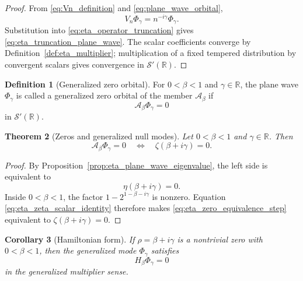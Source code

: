 \documentclass[11pt]{amsart}
\numberwithin{equation}{section}
\theoremstyle{plain}
\newtheorem{theorem}{Theorem}[section]
\newtheorem{corollary}[theorem]{Corollary}
\theoremstyle{definition}
\newtheorem{definition}[theorem]{Definition}
\theoremstyle{remark}
\newcommand{\R}{\mathbb{R}}
\newcommand{\Sch}{\mathcal{S}}
\begin{document}
\begin{proof}
From \eqref{eq:Vn_definition} and
\eqref{eq:plane_wave_orbital},
\begin{equation}
V_n\Phi_\gamma
=n^{-i\gamma}\Phi_\gamma.
\label{eq:Vn_plane_wave}
\end{equation}
Substitution into \eqref{eq:eta_operator_truncation} gives
\eqref{eq:eta_truncation_plane_wave}.  The scalar coefficients converge by
Definition~\ref{def:eta_multiplier}; multiplication of a fixed tempered
distribution by convergent scalars gives convergence in $\Sch'(\R)$.
\end{proof}

\begin{definition}[Generalized zero orbital]
\label{def:generalized_zero_orbital}
For $0<\beta<1$ and $\gamma\in\R$, the plane wave $\Phi_\gamma$ is called a
generalized zero orbital of the member $\mathcal A_\beta$ if
\begin{equation}
\mathcal A_\beta\Phi_\gamma=0
\label{eq:zero_orbital_definition}
\end{equation}
in $\Sch'(\R)$.
\end{definition}

\begin{theorem}[Zeros and generalized null modes]
\label{thm:zeros_as_generalized_null_modes}
Let $0<\beta<1$ and $\gamma\in\R$.  Then
\begin{equation}
\mathcal A_\beta\Phi_\gamma=0
\quad\Longleftrightarrow\quad
\zeta(\beta+i\gamma)=0.
\label{eq:zero_mode_equivalence}
\end{equation}
\end{theorem}

\begin{proof}
By Proposition~\ref{prop:eta_plane_wave_eigenvalue}, the left side is
equivalent to
\begin{equation}
\eta(\beta+i\gamma)=0.
\label{eq:eta_zero_equivalence_step}
\end{equation}
Inside $0<\beta<1$, the factor $1-2^{1-\beta-i\gamma}$ is nonzero.
Equation \eqref{eq:eta_zeta_scalar_identity} therefore makes
\eqref{eq:eta_zero_equivalence_step} equivalent to
$\zeta(\beta+i\gamma)=0$.
\end{proof}

\begin{corollary}[Hamiltonian form]
\label{cor:zero_orbital_hamiltonian}
If $\rho=\beta+i\gamma$ is a nontrivial zero with $0<\beta<1$, then the
generalized mode $\Phi_\gamma$ satisfies
\begin{equation}
H_\beta\Phi_\gamma=0
\label{eq:H_zero_orbital}
\end{equation}
in the generalized multiplier sense.
\end{corollary}
\end{document}
